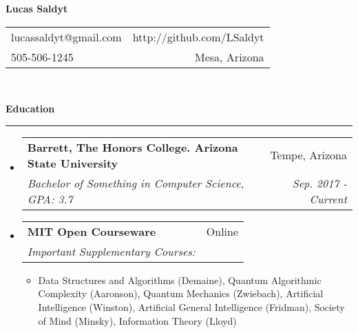\documentclass[letterpaper,11pt]{article}
\makeatletter
\newcommand{\sectionline}{
    \noindent\rule[0.5ex]{\linewidth}{0.5pt}
}
\newcommand{\resitem}[1]{\item #1 \vspace{-3pt}}
\newcommand{\resheading}[1]{
    {\large \textbf{#1}}
    \sectionline
}
\newcommand{\colfill}{@{\extracolsep{\fill}}}
\newcommand{\ressubheading}[4]{
\begin{tabular*}{6.5in}{l\colfill r}
		\textbf{#1} & #2 \\
		\textit{#3} & \textit{#4} \\
\end{tabular*}\vspace{-6pt}}
\makeatother
\begin{document}
\begin{center}
\textbf{\Large Lucas Saldyt}
\end{center}
\begin{tabular*}{7in}{l \colfill r}
lucassaldyt@gmail.com & http://github.com/LSaldyt\\
505-506-1245 & Mesa, Arizona \\
\end{tabular*}
\\


\vspace{0.1in}

\resheading{Education}
\begin{itemize}
\item
    \ressubheading{Barrett, The Honors College. Arizona State University}{Tempe, Arizona}{Bachelor of Something in Computer Science, GPA: 3.7}{Sep. 2017 - Current}
\item
    \ressubheading{MIT Open Courseware}{Online}{Important Supplementary Courses:}{}
	\begin{itemize}
            \resitem{Data Structures and Algorithms (Demaine), Quantum Algorithmic Complexity (Aaronson), Quantum Mechanics (Zwiebach), Artificial Intelligence (Winston), Artificial General Intelligence (Fridman), Society of Mind (Minsky), Information Theory (Lloyd)}
	\end{itemize}

\end{itemize}
\end{document}
